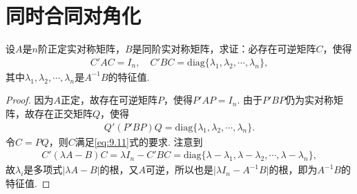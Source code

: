 \documentclass[../../main.tex]{subfiles}
\begin{document}
\section{同时合同对角化}

\begin{proposition}[同时合同对角化]\label{proposition:例9.75}
设\(A\)是\(n\)阶正定实对称矩阵，\(B\)是同阶实对称矩阵，求证：必存在可逆矩阵\(C\)，使得
\begin{align}
C'AC = I_n,\quad C'BC = \mathrm{diag}\{\lambda_1,\lambda_2,\cdots,\lambda_n\},\label{eq:9.11}
\end{align}
其中\(\lambda_1,\lambda_2,\cdots,\lambda_n\)是\(A^{-1}B\)的特征值.
\end{proposition}
\begin{proof}
因为\(A\)正定，故存在可逆矩阵\(P\)，使得\(P'AP = I_n\). 由于\(P'BP\)仍为实对称矩阵，故存在正交矩阵\(Q\)，使得
\begin{align*}
Q'(P'BP)Q = \mathrm{diag}\{\lambda_1,\lambda_2,\cdots,\lambda_n\}.
\end{align*}
令\(C = PQ\)，则\(C\)满足\eqref{eq:9.11}式的要求. 注意到
\begin{align*}
C'(\lambda A - B)C=\lambda I_n - C'BC = \mathrm{diag}\{\lambda - \lambda_1,\lambda - \lambda_2,\cdots,\lambda - \lambda_n\},
\end{align*}
故\(\lambda_i\)是多项式\(\vert\lambda A - B\vert\)的根，又\(A\)可逆，所以也是\(\vert\lambda I_n - A^{-1}B\vert\)的根，即为\(A^{-1}B\)的特征值. 

\end{proof}
\end{document}
